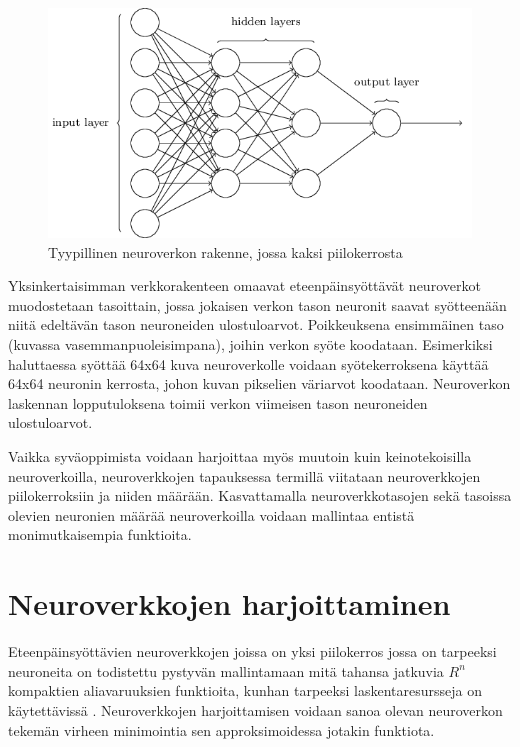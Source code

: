 \documentclass[finnish]{tktltiki2}
\theoremstyle{definition}
\theoremstyle{remark}
\begin{document}
  \begin{figure}[h]
  \centering
  \includegraphics[scale=0.5]{basic-neuralnet}
  \caption{Tyypillinen neuroverkon rakenne, jossa kaksi piilokerrosta \cite{Nielsen-neural}}
  \label{pic:neuralnet}
  \end{figure}

  Yksinkertaisimman verkkorakenteen omaavat eteenpäinsyöttävät neuroverkot muodostetaan tasoittain, jossa jokaisen verkon tason neuronit saavat syötteenään niitä edeltävän tason neuroneiden ulostuloarvot. Poikkeuksena ensimmäinen taso (kuvassa vasemmanpuoleisimpana), joihin verkon syöte koodataan. Esimerkiksi haluttaessa syöttää 64x64 kuva neuroverkolle voidaan syötekerroksena käyttää 64x64 neuronin kerrosta, johon kuvan pikselien väriarvot koodataan. Neuroverkon laskennan lopputuloksena toimii verkon viimeisen tason neuroneiden ulostuloarvot.

  Vaikka syväoppimista voidaan harjoittaa myös muutoin kuin keinotekoisilla neuroverkoilla, neuroverkkojen tapauksessa termillä viitataan neuroverkkojen piilokerroksiin ja niiden määrään. Kasvattamalla neuroverkkotasojen sekä tasoissa olevien neuronien määrää neuroverkoilla voidaan mallintaa entistä monimutkaisempia funktioita.

  \section{Neuroverkkojen harjoittaminen}
    \label{chap:neural-training}

  Eteenpäinsyöttävien neuroverkkojen joissa on yksi piilokerros jossa on tarpeeksi neuroneita on todistettu pystyvän mallintamaan mitä tahansa jatkuvia $R^n$ kompaktien aliavaruuksien funktioita, kunhan tarpeeksi laskentaresursseja on käytettävissä \cite{multilayer-feedforward-universal-approximators}. Neuroverkkojen harjoittamisen voidaan sanoa olevan neuroverkon tekemän virheen minimointia sen approksimoidessa jotakin funktiota.
\end{document}
